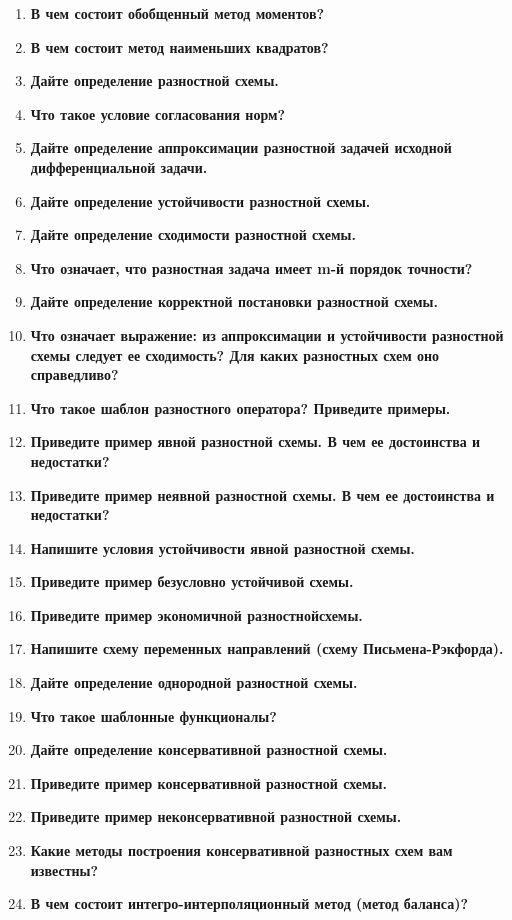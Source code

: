 \begin{enumerate}[label=\textbf{\underline{\arabic*.}}]
\item \textbf{В чем состоит обобщенный метод моментов?}
\item \textbf{В чем состоит метод наименьших квадратов?}
\item \textbf{Дайте определение разностной схемы.}
\item \textbf{Что такое условие согласования норм?}
\item \textbf{Дайте определение аппроксимации разностной задачей исходной дифференциальной задачи.}
\item \textbf{Дайте определение устойчивости разностной схемы.}
\item \textbf{Дайте определение сходимости разностной схемы.}
\item \textbf{Что означает, что разностная задача имеет m-й порядок точности?}
\item \textbf{Дайте определение корректной постановки разностной схемы.}
\item \textbf{Что означает выражение: из аппроксимации и устойчивости разностной схемы следует ее сходимость? Для каких разностных схем оно справедливо?}
\item \textbf{Что такое шаблон разностного оператора? Приведите примеры.}
\item \textbf{Приведите пример явной разностной схемы. В чем ее достоинства и недостатки?}
\item \textbf{Приведите пример неявной разностной схемы. В чем ее достоинства и недостатки?}
\item \textbf{Напишите условия устойчивости явной разностной схемы.}
\item \textbf{Приведите пример безусловно устойчивой схемы.}
\item \textbf{Приведите пример экономичной разностнойсхемы.}
\item \textbf{Напишите схему переменных направлений (схему Письмена-Рэкфорда).}
\item \textbf{Дайте определение однородной разностной схемы.}
\item \textbf{Что такое шаблонные функционалы?}
\item \textbf{Дайте определение консервативной разностной схемы.}
\item \textbf{Приведите пример консервативной разностной схемы.}
\item \textbf{Приведите пример неконсервативной разностной схемы.}
\item \textbf{Какие методы построения консервативной разностных схем вам известны?}
\item \textbf{В чем состоит интегро-интерполяционный метод (метод баланса)?}

\end{enumerate}
